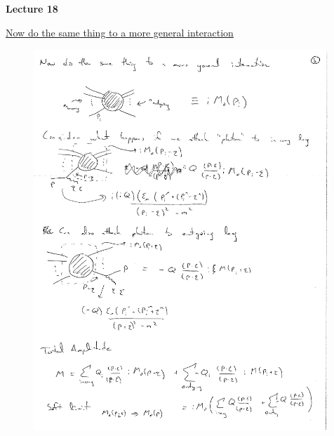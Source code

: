 
\usepackage{braket}
\usepackage{bbm}
\usepackage{relsize}
\usepackage{tcolorbox}



\usepackage{cancel}

\usepackage{fancyhdr}

\fancyhf{}


\thispagestyle{fancy}

\begin{center}
{\huge \textbf{Lecture 18}}
\end{center}

{\fontsize{14}{16}\selectfont

\underline{Now do the same thing to a more general interaction}


\begin{figure}[h]
\includegraphics[width=0.99\textwidth]{./generalScattering.pdf}
\end{figure}


}

